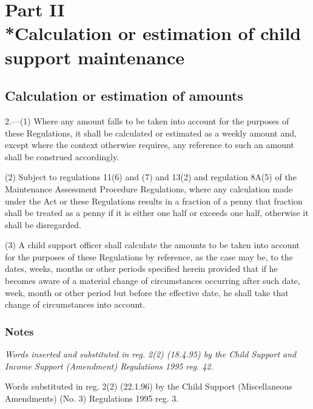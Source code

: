 \documentclass[a4paper]{article}
\newcommand{\parthead}{}
\newcommand\amendment[1]{\subsubsection*{Notes}{\itshape\frenchspacing\footnotesize #1 \par\goodbreak}}
\begin{document}
\section[Part II --- Calculation or estimation of child support maintenance]{\sloppy Part II\\*Calculation or estimation of child support maintenance}

\renewcommand\parthead{--- Part II}

\subsection[2. Calculation or estimation of amounts]{Calculation or estimation of amounts}

2.—(1) Where any amount falls to be taken into account for the purposes of these Regulations, it shall be calculated or estimated as a weekly amount and, except where the context otherwise requires, any reference to such an amount shall be construed accordingly.

(2) Subject to 
regulations 11(6) and (7) and 13(2) and 
  regulation 8A(5)  %
of the Maintenance Assessment Procedure Regulations,  %
where any calculation made under 
the Act or  %
these Regulations results in a fraction of a penny that fraction shall be treated as a penny if it is either one half or exceeds one half, otherwise it shall be disregarded.

(3) A child support officer shall calculate the amounts to be taken into account for the purposes of these Regulations by reference, as the case may be, to the dates, weeks, months or other periods specified herein provided that if he becomes aware of a material change of circumstances occurring after such date, week, month or other period but before the effective date, he shall take that change of circumstances into account.

\amendment{
Words inserted and substituted in reg. 2(2) (18.4.95) by the Child Support and Income Support (Amendment) Regulations 1995 reg. 42.


Words substituted in reg. 2(2) (22.1.96) by the Child Support (Miscellaneous Amendments) (No. 3) Regulations 1995 reg. 3.
}
\end{document}

